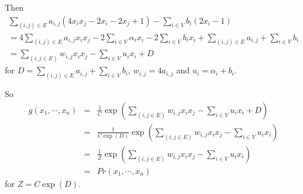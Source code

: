 \documentclass{article}
\begin{document}
\begin{enumerate}
	Then
	\begin{equation}
		\begin{aligned}
		\sum_{(i, j)\in E}a_{i,j}(4x_ix_j - 2x_i - 2x_j + 1) - \sum_{i \in V}b_i(2x_i - 1) \\
		= 4\sum_{(i, j)\in E}a_{i,j}x_ix_j - 2\sum_{i\in V}\alpha_i x_i - 2\sum_{i \in V}b_ix_i + \sum_{(i, j)\in E}a_{i,j} + \sum_{i \in V}b_i  \\
		= \sum_{(i,j\in E)}w_{i,j}x_ix_j - \sum_{i\in V}u_ix_i + D
		\end{aligned}
	\end{equation}
		for $D =  \sum_{(i, j)\in E}a_{i,j} + \sum_{i \in V}b_i$, $w_{i,j}=4a_{i,j}$ and $u_i = \alpha_i + b_i$.

	So 
	\begin{equation}\begin{aligned}
		g(x_1,\cdots,x_n) & = & \frac{1}{C}\exp(\sum_{(i,j\in E)}w_{i,j}x_ix_j - \sum_{i\in V}u_ix_i + D) \\
		& = & \frac{1}{C\exp(D)}\exp(\sum_{(i,j\in E)}w_{i,j}x_ix_j - \sum_{i\in V}u_ix_i) \\
		& = & \frac{1}{Z}\exp(\sum_{(i,j\in E)}w_{i,j}x_ix_j - \sum_{i\in V}u_ix_i) \\
		& = & Pr(x_1,\cdots,x_n)
	\end{aligned}\end{equation}
	for $Z = C\exp(D)$.


\end{enumerate}
\end{document}
